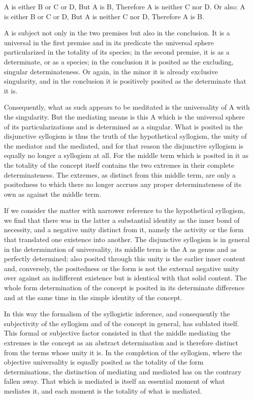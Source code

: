 A is either B or C or D,
But A is B,
Therefore A is neither C nor D.
Or also:
A is either B or C or D,
But A is neither C nor D,
Therefore A is B.

A is subject not only in the two premises
but also in the conclusion.
It is a universal in the first premise
and in its predicate the universal sphere
particularized in the totality of its species;
in the second premise, it is as a determinate,
or as a species;
in the conclusion it is posited as the excluding,
singular determinateness.
Or again, in the minor it is already exclusive singularity,
and in the conclusion it is positively posited
as the determinate that it is.

Consequently, what as such appears to be meditated is
the universality of A with the singularity.
But the mediating means is this A
which is the universal sphere of its particularizations
and is determined as a singular.
What is posited in the disjunctive syllogism is thus
the truth of the hypothetical syllogism,
the unity of the mediator and the mediated,
and for that reason the disjunctive syllogism is
equally no longer a syllogism at all.
For the middle term which is posited in it
as the totality of the concept itself contains
the two extremes in their complete determinateness.
The extremes, as distinct from this middle term,
are only a positedness to which
there no longer accrues any proper determinateness
of its own as against the middle term.

If we consider the matter with narrower reference
to the hypothetical syllogism,
we find that there was in the latter
a substantial identity as the inner bond of necessity,
and a negative unity distinct from it,
namely the activity or the form
that translated one existence into another.
The disjunctive syllogism is in general
in the determination of universality,
its middle term is the A as genus and as perfectly determined;
also posited through this unity is the earlier inner content
and, conversely, the positedness
or the form is not the external negative unity
over against an indifferent existence
but is identical with that solid content.
The whole form determination of the concept is
posited in its determinate difference
and at the same time in the simple identity of the concept.

In this way the formalism of the syllogistic inference,
and consequently the subjectivity of the syllogism
and of the concept in general,
has sublated itself.
This formal or subjective factor consisted in that
the middle mediating the extremes is
the concept as an abstract determination
and is therefore distinct from
the terms whose unity it is.
In the completion of the syllogism,
where the objective universality is
equally posited as the totality
of the form determinations,
the distinction of mediating and mediated has
on the contrary fallen away.
That which is mediated is itself
an essential moment of what mediates it,
and each moment is the totality of what is mediated.

